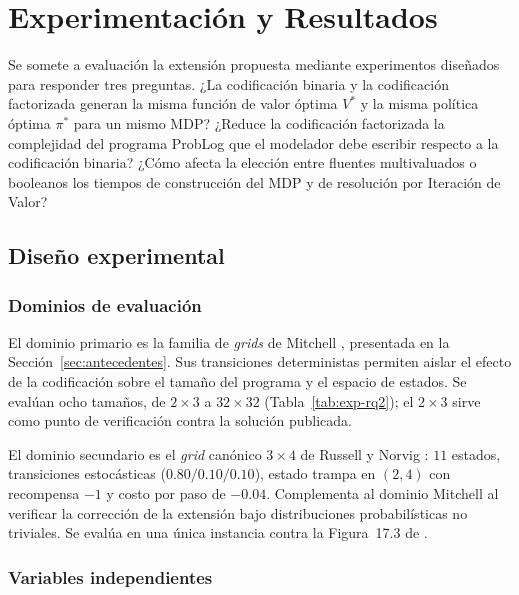 \section{Experimentación y Resultados}
\label{ch:experimentacion}

Se somete a evaluación la extensión propuesta mediante experimentos diseñados para responder tres preguntas. ¿La codificación binaria y la codificación factorizada generan la misma función de valor óptima \(V^*\) y la misma política óptima \(\pi^*\) para un mismo MDP? ¿Reduce la codificación factorizada la complejidad del programa ProbLog que el modelador debe escribir respecto a la codificación binaria? ¿Cómo afecta la elección entre fluentes multivaluados o booleanos los tiempos de construcción del MDP y de resolución por Iteración de Valor?

\subsection{Diseño experimental}
\label{sec:exp-diseno}

\subsubsection{Dominios de evaluación}
\label{sec:exp-dominios}

El dominio primario es la familia de \textit{grids} de Mitchell
\cite{mitchell1997machine}, presentada en la Sección~\ref{sec:antecedentes}.
Sus transiciones deterministas permiten aislar el efecto de la codificación
sobre el tamaño del programa y el espacio de estados. Se evalúan ocho tamaños,
de $2\times3$ a $32\times32$ (Tabla~\ref{tab:exp-rq2}); el $2\times3$ sirve
como punto de verificación contra la solución publicada.

El dominio secundario es el \textit{grid} canónico $3\times4$ de Russell y
Norvig \cite{russell2016artificial}: $11$ estados, transiciones estocásticas
($0.80/0.10/0.10$), estado trampa en $(2,4)$ con recompensa $-1$ y costo por
paso de $-0.04$. Complementa al dominio Mitchell al verificar la corrección
de la extensión bajo distribuciones probabilísticas no triviales. Se evalúa en
una única instancia contra la Figura~17.3 de \cite{russell2016artificial}.

\subsubsection{Variables independientes}
\label{sec:exp-variables}

